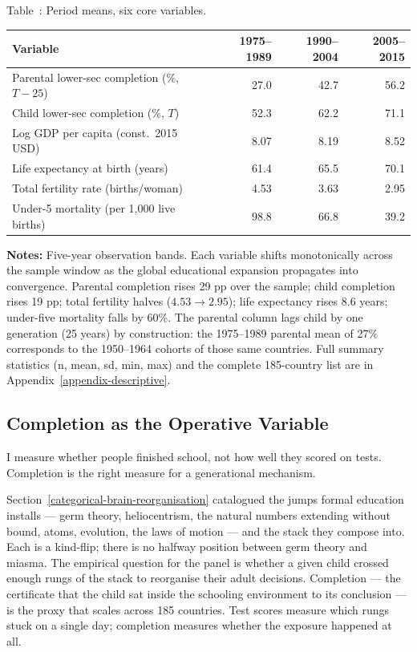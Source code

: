 \documentclass[12pt,letterpaper]{article}
\begin{document}
\label{tab:summary}Table~\thetable: Period means, six core variables.

{\small
\begin{longtable}[]{@{}lrrr@{}}
\toprule
Variable & 1975--1989 & 1990--2004 & 2005--2015 \\
\midrule
\endhead
Parental lower-sec completion (\%, $T{-}25$) & 27.0 & 42.7 & 56.2 \\
Child lower-sec completion (\%, $T$)          & 52.3 & 62.2 & 71.1 \\
Log GDP per capita (const.\ 2015 USD)         &  8.07 &  8.19 &  8.52 \\
Life expectancy at birth (years)              & 61.4 & 65.5 & 70.1 \\
Total fertility rate (births/woman)           &  4.53 &  3.63 &  2.95 \\
Under-5 mortality (per 1{,}000 live births)   & 98.8 & 66.8 & 39.2 \\
\bottomrule
\end{longtable}
}

\begin{minipage}{\dimexpr\textwidth-2em}
\scriptsize
\textbf{Notes:} Five-year observation bands. Each variable shifts
monotonically across the sample window as the global educational
expansion propagates into convergence. Parental
completion rises 29 pp over the sample; child completion rises 19
pp; total fertility halves ($4.53 \to 2.95$); life expectancy rises
8.6 years; under-five mortality falls by 60\%. The parental column
lags child by one generation (25 years) by construction: the
1975--1989 parental mean of 27\% corresponds to the 1950--1964
cohorts of those same countries. Full summary statistics (n, mean,
sd, min, max) and the complete 185-country list are in
Appendix~\ref{appendix-descriptive}.
\end{minipage}

\subsection{Completion as the Operative Variable}\label{completion-as-the-operative-variable}

I measure whether people finished school, not how well they
scored on tests. Completion is the right measure for a generational
mechanism.

Section~\ref{categorical-brain-reorganisation} catalogued the jumps
formal education installs --- germ theory, heliocentrism, the
natural numbers extending without bound, atoms, evolution, the laws
of motion --- and the stack they compose into. Each is a kind-flip;
there is no halfway position between germ theory and miasma. The
empirical question for the panel is whether a given child crossed
enough rungs of the stack to reorganise their adult decisions.
Completion --- the certificate that the child sat inside the
schooling environment to its conclusion --- is the proxy that
scales across 185 countries. Test scores measure which rungs stuck
on a single day; completion measures whether the exposure happened
at all.
\end{document}
